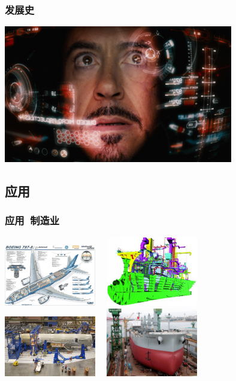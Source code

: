 \documentclass{beamer}
\begin{document}
\begin{frame}
	\frametitle{发展史}
	\transwipe
	\begin{center}
		\includegraphics[width=10cm]{images/iron-man-mark-vii-hud-design.png}
	\end{center}
\end{frame}

\subsection{应用}
\begin{frame}
	\frametitle{应用~{\small 制造业}}
	\begin{center}
		\includegraphics[width=4cm]{images/boeing-design.jpg}~~
		\includegraphics[width=4cm]{images/tribon-web.jpg}\\
		\includegraphics[width=4cm]{images/cam-airplane.jpg}~~
		\includegraphics[width=4cm]{images/ship-building.jpg}\\
	\end{center}
\end{frame}
\end{document}
